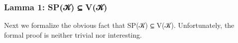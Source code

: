 \subsubsection{Lamma 1: SP(𝒦) ⊆ V(𝒦)}\label{lamma-1-spux1d4a6-vux1d4a6}
Next we formalize the obvious fact that \ad S\ad P(\ab 𝒦) \af ⊆ \ad V(\ab 𝒦). Unfortunately, the formal proof is neither trivial nor interesting.
\ccpad
\begin{code}%
\>[0][@{}l@{\AgdaIndent{1}}]%
\>[1]\AgdaSpace{}%
\AgdaSymbol{:}\AgdaSpace{}%
\AgdaSymbol{\{}\AgdaSymbol{\}\{}\AgdaSymbol{\}}\AgdaSpace{}%
\AgdaSymbol{(}\AgdaSymbol{\{}\AgdaSymbol{\}\{}\AgdaSymbol{\}}\AgdaSpace{}%
\AgdaSymbol{)}\AgdaSpace{}%
\AgdaSpace{}%
\AgdaSymbol{\{}\AgdaSymbol{\}\{}\AgdaSymbol{\}}\AgdaSpace{}%
\<%
\\
%
\\[\AgdaEmptyExtraSkip]%
%
\>[1]\AgdaSpace{}%
\AgdaSymbol{(}\AgdaSymbol{\{}\AgdaSymbol{\}}\AgdaSpace{}%
\AgdaSymbol{)}\AgdaSpace{}%
\AgdaSymbol{=}\AgdaSpace{}%
\<%
\\
\>[1][@{}l@{\AgdaIndent{0}}]%
\>[2]\<%
\\
\>[2][@{}l@{\AgdaIndent{0}}]%
\>[3]\AgdaSpace{}%
\AgdaSpace{}%
\AgdaSymbol{:}\AgdaSpace{}%
\AgdaSpace{}%
\AgdaSpace{}%
\<%
\\
%
\>[3]\AgdaSpace{}%
\AgdaSymbol{=}\AgdaSpace{}%
\AgdaSpace{}%
\AgdaSpace{}%
\<%
\\
%
\>[3]\AgdaSpace{}%
\AgdaSymbol{=}\AgdaSpace{}%
\AgdaSpace{}%
\AgdaSymbol{(}\AgdaSpace{}%
\AgdaSpace{}%
\AgdaSymbol{)}\AgdaSpace{}%
\<%
\\
%
\\[\AgdaEmptyExtraSkip]%
%
\>[3]\AgdaSpace{}%
\AgdaSymbol{:}\AgdaSpace{}%
\AgdaSpace{}%
\AgdaSpace{}%
\AgdaSymbol{\{}\AgdaSymbol{\}\{}\AgdaSymbol{\}}\AgdaSpace{}%
\<%
\\
%

\end{code}
